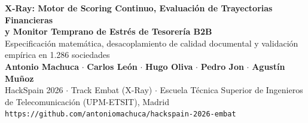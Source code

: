 \documentclass[10pt,a4paper]{article}
\begin{document}
\begin{center}
  {\fontsize{18}{22}\selectfont\bfseries\color{embatnavy} X-Ray: Motor de Scoring Continuo, Evaluación de Trayectorias Financieras\\ y Monitor Temprano de Estrés de Tesorería B2B}\\[0.4em]
  {\large\color{textmuted} Especificación matemática, desacoplamiento de calidad documental y validación empírica en 1.286 sociedades}\\[0.8em]
  
  {\small\textbf{Antonio Machuca} \quad $\cdot$ \quad \textbf{Carlos León} \quad $\cdot$ \quad \textbf{Hugo Oliva} \quad $\cdot$ \quad \textbf{Pedro Jon} \quad $\cdot$ \quad \textbf{Agustín Muñoz}}\\[0.2em]
  {\footnotesize\color{textmuted} HackSpain 2026 $\cdot$ Track Embat (X-Ray) $\cdot$ Escuela Técnica Superior de Ingenieros de Telecomunicación (UPM-ETSIT), Madrid}\\[0.2em]
  {\footnotesize\color{accentblue}\texttt{https://github.com/antoniomachuca/hackspain-2026-embat}}
\end{center}

\vspace{0.3em}
\end{document}
